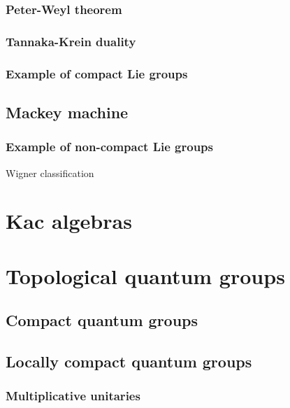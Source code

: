 \documentclass{../note}
\begin{document}
\section{Peter-Weyl theorem}
\section{Tannaka-Krein duality}
\section{Example of compact Lie groups}

\chapter{Mackey machine}
\section{Example of non-compact Lie groups}
Wigner classification








\part{Kac algebras}





\part{Topological quantum groups}
\chapter{Compact quantum groups}
\chapter{Locally compact quantum groups}
\section{Multiplicative unitaries}
\end{document}

